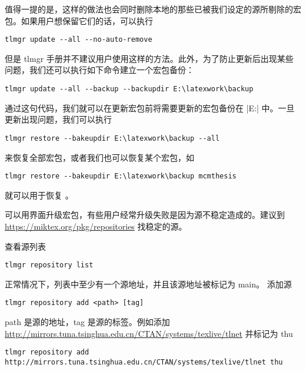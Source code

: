 值得一提的是，这样的做法也会同时删除本地的那些已被我们设定的源所剔除的宏包。如果用户想保留它们的话，可以执行

\begin{verbatim}
tlmgr update --all --no-auto-remove
\end{verbatim}

但是 tlmgr
手册并不建议用户使用这样的方法。此外，为了防止更新后出现某些问题，我们还可以执行如下命令建立一个宏包备份：

\begin{verbatim}
tlmgr update --all --backup --backupdir E:\latexwork\backup
\end{verbatim}

通过这句代码，我们就可以在更新宏包前将需要更新的宏包备份在
|E:\latexwork\backup| 中。一旦更新出现问题，我们可以执行

\begin{verbatim}
tlmgr restore --bakeupdir E:\latexwork\backup --all
\end{verbatim}

来恢复全部宏包，或者我们也可以恢复某个宏包，如

\begin{verbatim}
tlmgr restore --bakeupdir E:\latexwork\backup mcmthesis
\end{verbatim}

就可以用于恢复 。



\MiKTeX{}
可以用界面升级宏包，有些用户经常升级失败是因为源不稳定造成的。建议到
\url{https://miktex.org/pkg/repositories} 找稳定的源。



查看源列表
\begin{verbatim}
tlmgr repository list
\end{verbatim}

正常情况下，列表中至少有一个源地址，并且该源地址被标记为 main。 添加源
\begin{verbatim}
tlmgr repository add <path> [tag]
\end{verbatim}

path 是源的地址，tag 是源的标签。例如添加
\url{http://mirrors.tuna.tsinghua.edu.cn/CTAN/systems/texlive/tlnet} 并标记为 thu
\begin{verbatim}
tlmgr repository add http://mirrors.tuna.tsinghua.edu.cn/CTAN/systems/texlive/tlnet thu
\end{verbatim}

